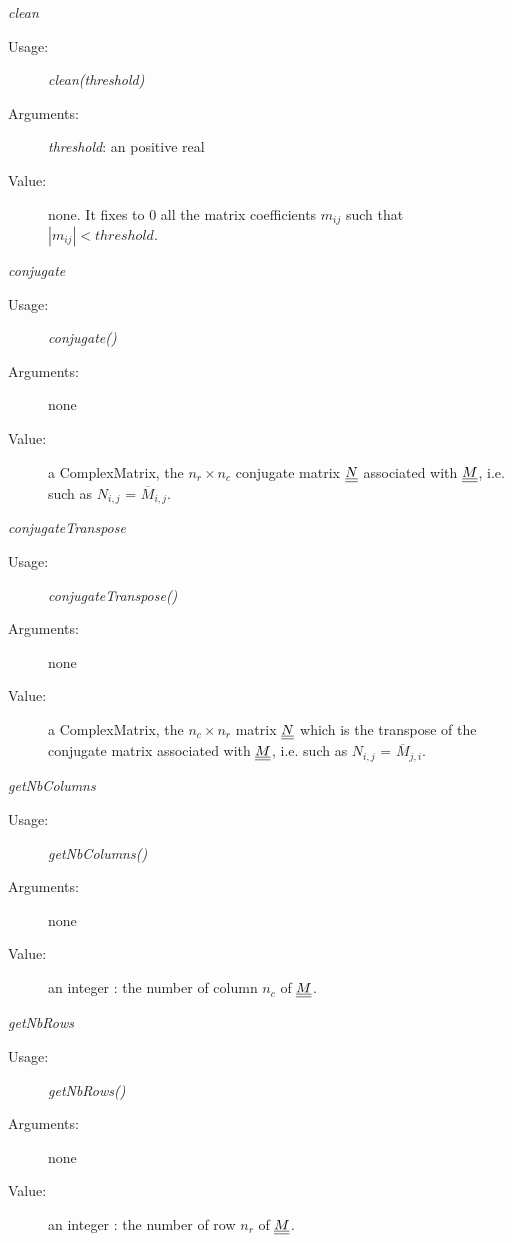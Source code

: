 \begin{description}
\begin{description}
\item \textit{clean}
\begin{description}
\item[Usage:] \textit{clean(threshold)}
\item[Arguments:] \textit{threshold}: an positive real
\item[Value:] none. It fixes to 0 all the matrix coefficients $m_{ij}$ such that $|m_{ij}| < threshold$.
\end{description}
\bigskip

\item \textit{conjugate}
\begin{description}
\item[Usage:] \textit{conjugate()}
\item[Arguments:] none
\item[Value:] a ComplexMatrix, the $n_r\times n_c$ conjugate matrix ${\underline{\underline{N}}}$ associated with ${\underline{\underline{M}}}$, i.e. such as $N_{i,j}$ = $\overline{M}_{i,j}$.
\end{description}
\bigskip

\item \textit{conjugateTranspose}
\begin{description}
\item[Usage:] \textit{conjugateTranspose()}
\item[Arguments:] none
\item[Value:] a ComplexMatrix, the $n_c\times n_r$ matrix ${\underline{\underline{N}}}$ which is the transpose of the conjugate matrix associated with ${\underline{\underline{M}}}$, i.e.  such as $N_{i,j}$ = $\overline{M}_{j,i}$.
\end{description}
\bigskip

\item \textit{getNbColumns}
\begin{description}
\item[Usage:] \textit{getNbColumns()}
\item[Arguments:] none
\item[Value:] an integer : the number of column $n_c$ of ${\underline{\underline{M}}}$.
\end{description}
\bigskip

\item \textit{getNbRows}
\begin{description}
\item[Usage:] \textit{getNbRows()}
\item[Arguments:] none
\item[Value:] an integer : the number of row $n_r$ of ${\underline{\underline{M}}}$.
\end{description}
\bigskip


\end{description}
\end{description}
